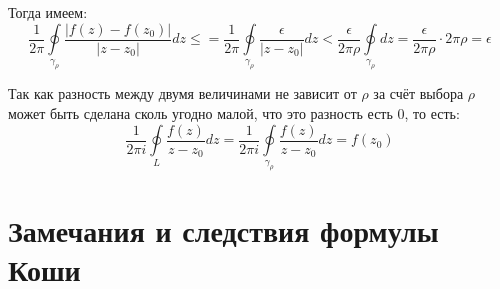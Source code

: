 \documentclass[a4paper, 12pt]{report}
\begin{document}
Тогда имеем:
\[
     \frac{1}{2\pi}\oint\limits_{\gamma_\rho}\frac{|f(z)-f(z_0)|}{|z-z_0|}dz \leq  =
    \frac{1}{2\pi}\oint\limits_{\gamma_\rho}\frac{\epsilon}{|z-z_0|}dz < \frac{\epsilon}{2\pi\rho}\oint\limits_{\gamma_\rho}dz = \frac{\epsilon}{2\pi \rho} \cdot 2\pi\rho = \epsilon
\]

Так как разность между двумя величинами не зависит от $\rho$ за счёт выбора $\rho$ может быть сделана сколь угодно малой, что это разность есть $0$, то есть:
 \[
    \frac{1}{2\pi i}\oint\limits_{L}\frac{f(z)}{z-z_0}dz = \frac{1}{2\pi i}\oint\limits_{\gamma_\rho}\frac{f(z)}{z-z_0}dz = f(z_0)
 \]
\blacksquare
 
\section{Замечания и следствия формулы Коши}
\end{document}
